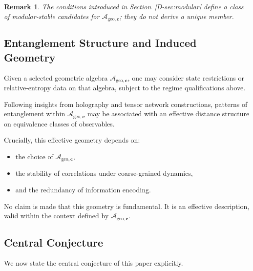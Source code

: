 \documentclass[12pt,a4paper,openany]{book}
\newtheorem{remark}[theorem]{Remark}
\begin{document}
\begin{remark}
The conditions introduced in Section~\ref{D-sec:modular} define a class of modular-stable candidates for $\mathcal{A}_{\mathrm{geo},\mathbf{c}}$; they do not derive a unique member.
\end{remark}

\subsection{Entanglement Structure and Induced Geometry}

Given a selected geometric algebra $\mathcal{A}_{\mathrm{geo},\mathbf{c}}$, one may consider state restrictions or relative-entropy data on that algebra, subject to the regime qualifications above.

Following insights from holography and tensor network constructions, patterns of entanglement within $\mathcal{A}_{\mathrm{geo},\mathbf{c}}$ may be associated with an effective distance structure on equivalence classes of observables.

Crucially, this effective geometry depends on:
\begin{itemize}
    \item the choice of $\mathcal{A}_{\mathrm{geo},\mathbf{c}}$,
    \item the stability of correlations under coarse-grained dynamics,
    \item and the redundancy of information encoding.
\end{itemize}

No claim is made that this geometry is fundamental. It is an effective description, valid within the context defined by $\mathcal{A}_{\mathrm{geo},\mathbf{c}}$.

\subsection{Central Conjecture}

We now state the central conjecture of this paper explicitly.
\end{document}
